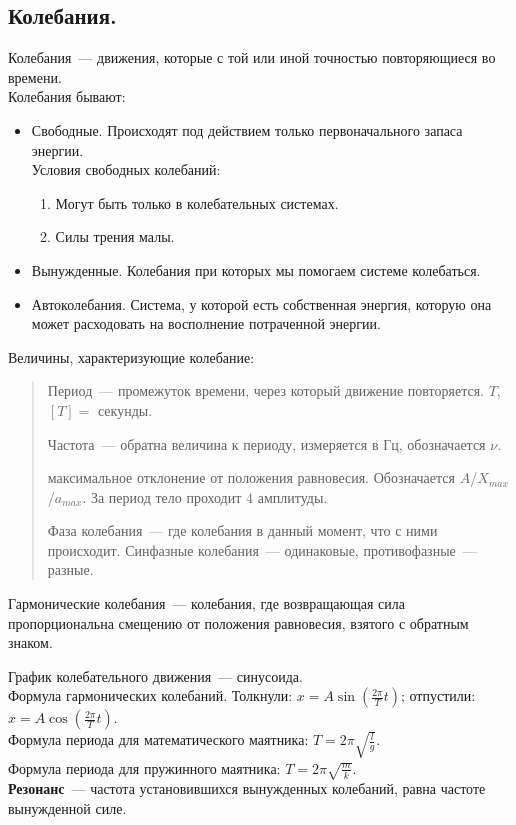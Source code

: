 \documentclass[12pt]{article}
\begin{document}
	\subsection{Колебания.}
	\begin{definition}
		Колебания~--- движения, которые с той или иной точностью повторяющиеся во времени. \\
		Колебания бывают:
		\begin{itemize}
			\item Свободные. Происходят под действием только первоначального запаса энергии. \\
			Условия свободных колебаний:
			\begin{enumerate}
				\item Могут быть только в колебательных системах.
				\item Силы трения малы.
			\end{enumerate}
			\item Вынужденные. Колебания при которых мы помогаем системе колебаться.
			\item Автоколебания. Система, у которой есть собственная энергия, которую она может расходовать на восполнение потраченной энергии.
		\end{itemize}
	\end{definition}
	\begin{definition}
		Величины, характеризующие колебание:
		\begin{quote}
			\begin{definition}
				Период~--- промежуток времени, через который движение повторяется. $T$, $[T] =$ секунды.
			\end{definition}
			\begin{definition}
				Частота~--- обратна величина к периоду, измеряется в Гц, обозначается $\nu$.
			\end{definition}
			\begin{definition}
				максимальное отклонение от положения равновесия. Обозначается $A$/$X_{max}$/$a_{max}$. За период тело проходит $4$ амплитуды.
			\end{definition}
			\begin{definition}
				Фаза колебания~--- где колебания в данный момент, что с ними происходит. Синфазные колебания~--- одинаковые, противофазные~--- разные.
			\end{definition}
		\end{quote}
	\end{definition}
	\begin{definition}
		Гармонические колебания~--- колебания, где возвращающая сила пропорциональна смещению от положения равновесия, взятого с обратным знаком.
	\end{definition}
	\noindent
	График колебательного движения~--- синусоида. \\
	Формула гармонических колебаний. Толкнули: $x = A \sin (\frac{2\pi}{T} t)$; отпустили: $x = A \cos (\frac{2\pi}{T} t)$. \\
	Формула периода для математического маятника: $T = 2\pi\sqrt{\frac{l}{g}}$. \\
	Формула периода для пружинного маятника: $T = 2\pi\sqrt{\frac{m}{k}}$. \\
	\textbf{Резонанс}~--- частота установившихся вынужденных колебаний, равна частоте вынужденной силе.
\end{document}
